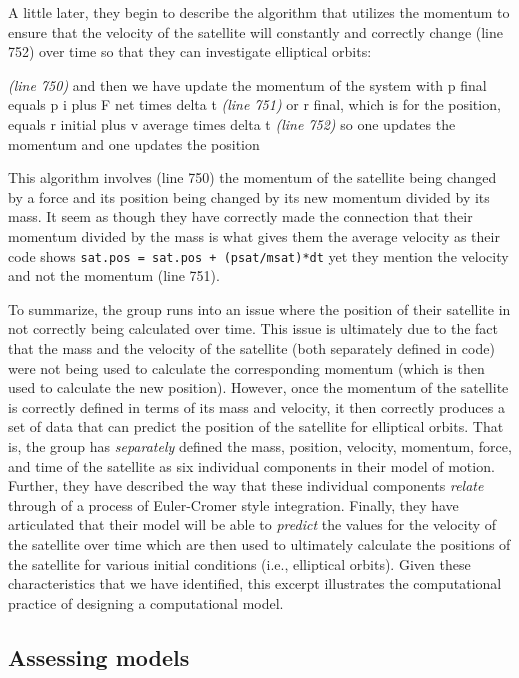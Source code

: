 \documentclass{msuphddissertation}
\begin{document}
\begin{doublespace}
A little later, they begin to describe the algorithm that utilizes the momentum to ensure that the velocity of the satellite will constantly and correctly change (line 752) over time so that they can investigate elliptical orbits: \begin{description}
\SD \textit{(line 750)} and then we have update the momentum of the system with p final equals p i plus F net times delta t
\SD \textit{(line 751)} or r final, which is for the position, equals r initial plus v average times delta t
\SD \textit{(line 752)} so one updates the momentum and one updates the position
\end{description}  This algorithm involves (line 750) the momentum of the satellite being changed by a force and its position being changed by its new momentum divided by its mass.  It seem as though they have correctly made the connection that their momentum divided by the mass is what gives them the average velocity as their code shows \texttt{sat.pos = sat.pos + (psat/msat)*dt} yet they mention the velocity and not the momentum (line 751).

To summarize, the group runs into an issue where the position of their satellite in not correctly being calculated over time.  This issue is ultimately due to the fact that the mass and the velocity of the satellite (both separately defined in code) were not being used to calculate the corresponding momentum (which is then used to calculate the new position).  However, once the momentum of the satellite is correctly defined in terms of its mass and velocity, it then correctly produces a set of data that can predict the position of the satellite for elliptical orbits.  That is, the group has \textit{separately} defined the mass, position, velocity, momentum, force, and time of the satellite as six individual components in their model of motion.  Further, they have described the way that these individual components \textit{relate} through of a process of Euler-Cromer style integration.  Finally, they have articulated that their model will be able to \textit{predict} the values for the velocity of the satellite over time which are then used to ultimately calculate the positions of the satellite for various initial conditions (i.e., elliptical orbits).  Given these characteristics that we have identified, this excerpt illustrates the computational practice of designing a computational model.

\subsection{Assessing models}


\end{doublespace}
\end{document}
